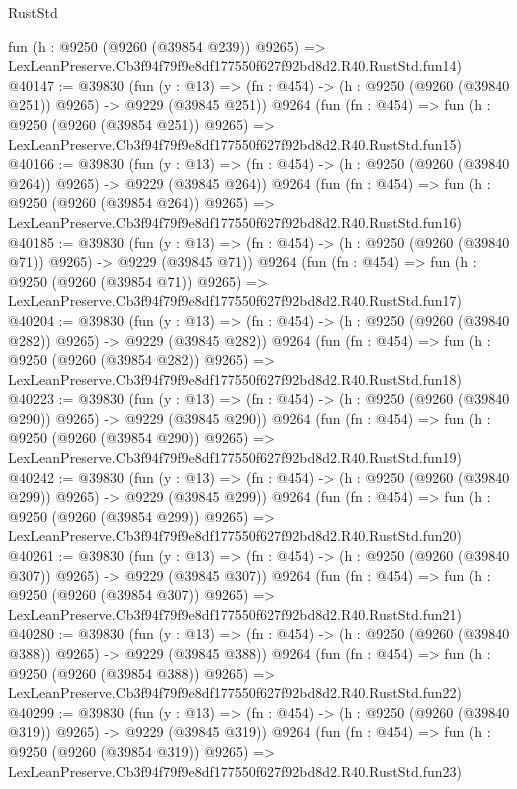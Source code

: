 \begin{lexlean}{RustStd}
\begin{coremodule}
    fun (h : @9250 (@9260 (@39854 @239)) @9265) =>
    LexLeanPreserve.Cb3f94f79f9e8df177550f627f92bd8d2.R40.RustStd.fun14)
@40147 := @39830
    (fun (y : @13) => (fn : @454) -> (h : @9250 (@9260 (@39840 @251)) @9265) -> @9229 (@39845 @251))
    @9264
    (fun (fn : @454) =>
    fun (h : @9250 (@9260 (@39854 @251)) @9265) =>
    LexLeanPreserve.Cb3f94f79f9e8df177550f627f92bd8d2.R40.RustStd.fun15)
@40166 := @39830
    (fun (y : @13) => (fn : @454) -> (h : @9250 (@9260 (@39840 @264)) @9265) -> @9229 (@39845 @264))
    @9264
    (fun (fn : @454) =>
    fun (h : @9250 (@9260 (@39854 @264)) @9265) =>
    LexLeanPreserve.Cb3f94f79f9e8df177550f627f92bd8d2.R40.RustStd.fun16)
@40185 := @39830
    (fun (y : @13) => (fn : @454) -> (h : @9250 (@9260 (@39840 @71)) @9265) -> @9229 (@39845 @71))
    @9264
    (fun (fn : @454) =>
    fun (h : @9250 (@9260 (@39854 @71)) @9265) =>
    LexLeanPreserve.Cb3f94f79f9e8df177550f627f92bd8d2.R40.RustStd.fun17)
@40204 := @39830
    (fun (y : @13) => (fn : @454) -> (h : @9250 (@9260 (@39840 @282)) @9265) -> @9229 (@39845 @282))
    @9264
    (fun (fn : @454) =>
    fun (h : @9250 (@9260 (@39854 @282)) @9265) =>
    LexLeanPreserve.Cb3f94f79f9e8df177550f627f92bd8d2.R40.RustStd.fun18)
@40223 := @39830
    (fun (y : @13) => (fn : @454) -> (h : @9250 (@9260 (@39840 @290)) @9265) -> @9229 (@39845 @290))
    @9264
    (fun (fn : @454) =>
    fun (h : @9250 (@9260 (@39854 @290)) @9265) =>
    LexLeanPreserve.Cb3f94f79f9e8df177550f627f92bd8d2.R40.RustStd.fun19)
@40242 := @39830
    (fun (y : @13) => (fn : @454) -> (h : @9250 (@9260 (@39840 @299)) @9265) -> @9229 (@39845 @299))
    @9264
    (fun (fn : @454) =>
    fun (h : @9250 (@9260 (@39854 @299)) @9265) =>
    LexLeanPreserve.Cb3f94f79f9e8df177550f627f92bd8d2.R40.RustStd.fun20)
@40261 := @39830
    (fun (y : @13) => (fn : @454) -> (h : @9250 (@9260 (@39840 @307)) @9265) -> @9229 (@39845 @307))
    @9264
    (fun (fn : @454) =>
    fun (h : @9250 (@9260 (@39854 @307)) @9265) =>
    LexLeanPreserve.Cb3f94f79f9e8df177550f627f92bd8d2.R40.RustStd.fun21)
@40280 := @39830
    (fun (y : @13) => (fn : @454) -> (h : @9250 (@9260 (@39840 @388)) @9265) -> @9229 (@39845 @388))
    @9264
    (fun (fn : @454) =>
    fun (h : @9250 (@9260 (@39854 @388)) @9265) =>
    LexLeanPreserve.Cb3f94f79f9e8df177550f627f92bd8d2.R40.RustStd.fun22)
@40299 := @39830
    (fun (y : @13) => (fn : @454) -> (h : @9250 (@9260 (@39840 @319)) @9265) -> @9229 (@39845 @319))
    @9264
    (fun (fn : @454) =>
    fun (h : @9250 (@9260 (@39854 @319)) @9265) =>
    LexLeanPreserve.Cb3f94f79f9e8df177550f627f92bd8d2.R40.RustStd.fun23)

\end{coremodule}
\end{lexlean}

